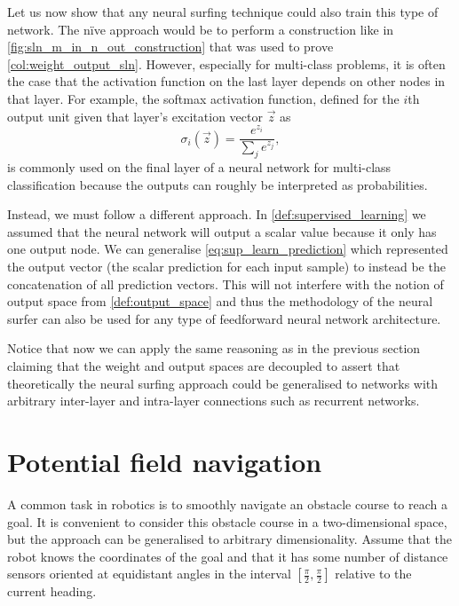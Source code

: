 Let us now show that any neural surfing technique could also train this type of network.
The n\"{i}ve approach would be to perform a construction like in \ref{fig:sln_m_in_n_out_construction} that was used to prove \ref{col:weight_output_sln}.
However, especially for multi-class problems, it is often the case that the activation function on the last layer depends on other nodes in that layer.
For example, the softmax activation function, defined for the $i$th output unit given that layer's excitation vector $\vec{z}$ as
\begin{equation}
    \sigma_i(\vec{z}) = \frac{e^{z_i}}{\sum_j{e^{z_j}}},
\end{equation}
is commonly used on the final layer of a neural network for multi-class classification because the outputs can roughly be interpreted as probabilities. 

Instead, we must follow a different approach. 
In \ref{def:supervised_learning} we assumed that the neural network will output a scalar value because it only has one output node. 
We can generalise \ref{eq:sup_learn_prediction} which represented the output vector (the scalar prediction for each input sample) to instead be the concatenation of all prediction vectors.
This will not interfere with the notion of output space from \ref{def:output_space} and thus the methodology of the neural surfer can also be used for any type of feedforward neural network architecture.

Notice that now we can apply the same reasoning as in the previous section claiming that the weight and output spaces are decoupled to assert that theoretically the neural surfing approach could be generalised to networks with arbitrary inter-layer and intra-layer connections such as recurrent networks.

\section{Potential field navigation}
A common task in robotics is to smoothly navigate an obstacle course to reach a goal.
It is convenient to consider this obstacle course in a two-dimensional space, but the approach can be generalised to arbitrary dimensionality.
Assume that the robot knows the coordinates of the goal and that it has some number of distance sensors oriented at equidistant angles in the interval $[\frac{\pi}{2},\frac{\pi}{2}]$ relative to the current heading.

